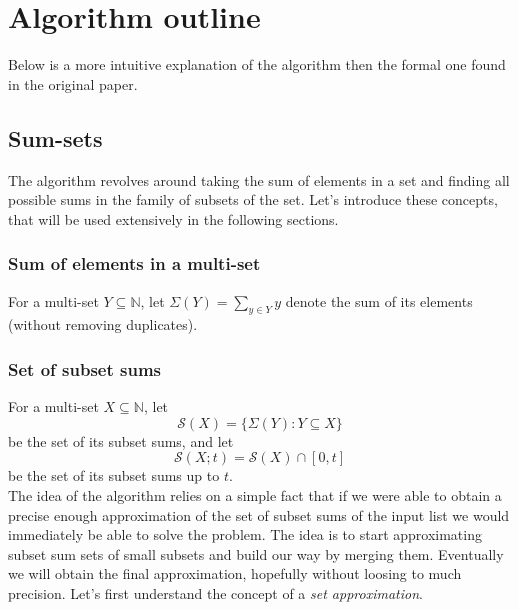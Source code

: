 \section{Algorithm outline}
Below is a more intuitive explanation of the algorithm then the formal one found in the original paper. 

\subsection{Sum-sets}
The algorithm revolves around taking the sum of elements in a set and finding all possible sums in the family of subsets of the set. Let's introduce these concepts, that will be used extensively in the following sections.
\subsubsection{Sum of elements in a multi-set}
For a multi-set \( Y \subseteq \mathbb{N} \), let \( \Sigma(Y) = \sum_{y \in Y} y \) denote the sum of its elements (without removing duplicates).
\subsubsection {Set of subset sums}
For a multi-set \( X \subseteq \mathbb{N} \), let 
\[ 
    \mathcal{S}(X) = \{ \Sigma(Y) : Y \subseteq X \} 
\] be the set of its subset sums, and let 
\[ 
    \mathcal{S}(X; t) = \mathcal{S}(X) \cap [0, t] 
\] be the set of its subset sums up to \( t \). \\ 

The idea of the algorithm relies on a simple fact that if we were able to obtain a precise enough approximation of the set of subset sums of the input list we would immediately be able to solve the \Partition problem. The idea is to start approximating subset sum sets of small subsets and build our way by merging them. Eventually we will obtain the final approximation, hopefully without loosing to much precision. Let's first understand the concept of a \textit{set approximation}.

